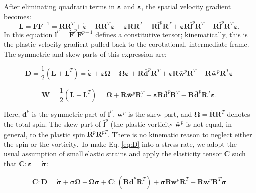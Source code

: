 \documentclass[11pt]{report}
\numberwithin{equation}{section}
\newcommand{\noi}{\noindent}
\begin{document}
After eliminating quadratic terms in $\bm{\varepsilon}$ and $\dot{\bm{\varepsilon}}$,
the spatial velocity gradient becomes:
\[
\mathbf{L}=\dot{\mathbf{F}}\mathbf{F}^{-1}=\dot{\mathbf{R}}\mathbf{R}^{T}+
\dot{\bm{\varepsilon}}+\dot{\mathbf{R}}\mathbf{R}^{T}\bm{\varepsilon}-\bm{\varepsilon}
\dot{\mathbf{R}}\mathbf{R}^{T}+\mathbf{R}\bar{\mathbf{l}}^{p}\mathbf{R}^{T}+
\bm{\varepsilon}\mathbf{R}\bar{\mathbf{l}}^{p}\mathbf{R}^{T}-
\mathbf{R}\bar{\mathbf{l}}^{p}\mathbf{R}^{T}\bm{\varepsilon}.
\]
In this equation $\bar{\mathbf{l}}^{p}=\dot{\mathbf{F}}^{p}\mathbf{F}^{p-1}$
defines a constitutive tensor; kinematically, this is the plastic
velocity gradient pulled back to the corotational, intermediate frame.
The symmetric and skew parts of this expression are:

\begin{equation}
\mathbf{D}=\frac{1}{2}\left(\mathbf{L}+\mathbf{L}^{T}\right)=
\dot{\bm{\varepsilon}}+\bm{\varepsilon}\bm{\Omega}-\bm{\Omega}\bm{\varepsilon}+
\mathbf{R}\bar{\mathbf{d}}^{p}\mathbf{R}^{T}+
\bm{\varepsilon}\mathbf{R}\bar{\mathbf{w}}^{p}\mathbf{R}^{T}-
\mathbf{R}\bar{\mathbf{w}}^{p}\mathbf{R}^{T}\bm{\varepsilon}\label{eq:D}
\end{equation}

\begin{equation}
\mathbf{W}=\frac{1}{2}\left(\mathbf{L}-\mathbf{L}^{T}\right)=
\bm{\Omega}+\mathbf{R}\bar{\mathbf{w}}^{p}\mathbf{R}^{T}+
\bm{\varepsilon}\mathbf{R}\bar{\mathbf{d}}^{p}\mathbf{R}^{T}-
\mathbf{R}\bar{\mathbf{d}}^{p}\mathbf{R}^{T}\bm{\varepsilon}.\label{eq:W}
\end{equation}

\noi Here, $\bar{\mathbf{d}}^{p}$ is the symmetric part of $\bar{\mathbf{l}}^{p}$,
$\bar{\mathbf{w}}^{p}$ is the skew part, and $\bm{\Omega}=\dot{\mathbf{R}}\mathbf{R}^{T}$
denotes the total spin. The skew part of $\bar{\mathbf{l}}^{p}$ (the
plastic vorticity $\bar{\mathbf{w}}^{p}$ is not equal, in general,
to the plastic spin $\dot{\mathbf{R}^{p}}\mathbf{R}^{pT}$. There
is no kinematic reason to neglect either the spin or the vorticity.
To make Eq. \ref{eq:D} into a stress rate, we adopt the usual assumption
of small elastic strains and apply the elasticity tensor $\mathbf{C}$
such that $\mathbf{C}:\dot{\bm{\varepsilon}}=\dot{\bm{\sigma}}$:

\begin{equation}
\mathbf{C}:\mathbf{D}=\dot{\bm{\sigma}}+\bm{\sigma}\bm{\Omega}-
\bm{\Omega}\bm{\sigma}+\mathbf{C}:\left(\mathbf{R}\bar{\mathbf{d}}^{p}\mathbf{R}^{T}\right)+
\bm{\sigma}\mathbf{R}\bar{\mathbf{w}}^{p}\mathbf{R}^{T}-
\mathbf{R}\bar{\mathbf{w}}^{p}\mathbf{R}^{T}\bm{\sigma}\label{eq:pre-gn}
\end{equation}
\end{document}
